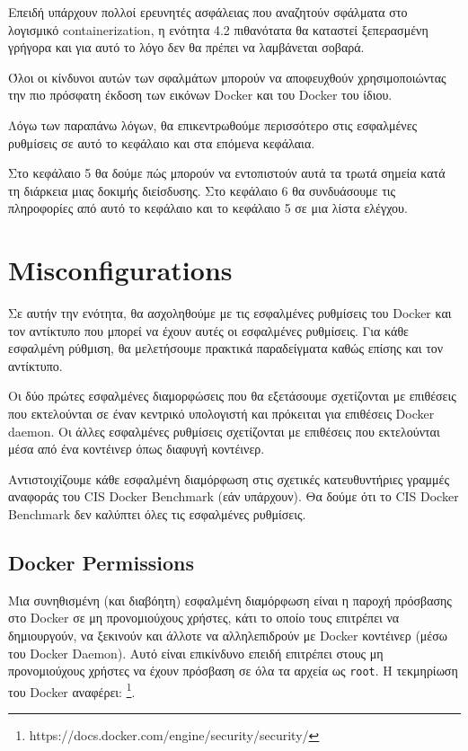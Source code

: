 Επειδή υπάρχουν πολλοί ερευνητές ασφάλειας που αναζητούν σφάλματα στο λογισμικό
\textlatin{containerization}, η ενότητα 4.2 πιθανότατα θα καταστεί ξεπερασμένη
γρήγορα και για αυτό το λόγο δεν θα πρέπει να λαμβάνεται σοβαρά.

Όλοι οι κίνδυνοι αυτών των σφαλμάτων μπορούν να αποφευχθούν χρησιμοποιώντας
την πιο πρόσφατη έκδοση των εικόνων \textlatin{Docker} και του
\textlatin{Docker} του ίδιου.

Λόγω των παραπάνω λόγων, θα επικεντρωθούμε περισσότερο στις εσφαλμένες
ρυθμίσεις σε αυτό το κεφάλαιο και στα επόμενα κεφάλαια.

Στο κεφάλαιο 5 θα δούμε πώς μπορούν να εντοπιστούν αυτά τα τρωτά σημεία
κατά τη διάρκεια μιας δοκιμής διείσδυσης. Στο κεφάλαιο 6 θα συνδυάσουμε τις
πληροφορίες από αυτό το κεφάλαιο και το κεφάλαιο 5 σε μια λίστα ελέγχου.

\section{\textlatin{Misconfigurations}}

Σε αυτήν την ενότητα, θα ασχοληθούμε με τις εσφαλμένες ρυθμίσεις του
\textlatin{Docker} και τον αντίκτυπο που μπορεί να έχουν αυτές οι εσφαλμένες
ρυθμίσεις. Για κάθε εσφαλμένη ρύθμιση, θα μελετήσουμε πρακτικά
παραδείγματα καθώς επίσης και τον αντίκτυπο.


Οι δύο πρώτες εσφαλμένες διαμορφώσεις που θα εξετάσουμε σχετίζονται με
επιθέσεις που εκτελούνται σε έναν κεντρικό υπολογιστή και πρόκειται για
επιθέσεις \textlatin{Docker daemon}. Οι άλλες εσφαλμένες ρυθμίσεις σχετίζονται
με επιθέσεις που εκτελούνται μέσα από ένα κοντέινερ όπως διαφυγή κοντέινερ.

Αντιστοιχίζουμε κάθε εσφαλμένη διαμόρφωση στις σχετικές κατευθυντήριες γραμμές
αναφοράς του \textlatin{CIS Docker Benchmark} (εάν υπάρχουν). Θα δούμε ότι το
\textlatin{CIS Docker Benchmark} δεν καλύπτει όλες τις εσφαλμένες
ρυθμίσεις.

\subsection{\textlatin{Docker Permissions}}

Μια συνηθισμένη (και διαβόητη) εσφαλμένη διαμόρφωση είναι η παροχή πρόσβασης
στο \textlatin{Docker} σε μη προνομιούχους χρήστες, κάτι το οποίο τους επιτρέπει
να δημιουργούν, να ξεκινούν και άλλοτε να αλληλεπιδρούν με \textlatin{Docker}
κοντέινερ (μέσω του \textlatin{Docker Daemon}). Αυτό είναι επικίνδυνο επειδή
επιτρέπει στους μη προνομιούχους χρήστες να έχουν πρόσβαση σε όλα τα αρχεία ως
\texttt{\textlatin{root}}. Η τεκμηρίωση του \textlatin{Docker} αναφέρει:
\footnote{\textlatin{https://docs.docker.com/engine/security/security/}}.

